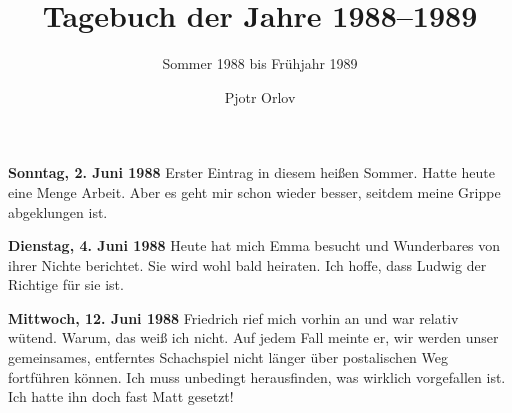 \documentclass[a4paper,11pt,DIV=calc]{scrartcl}
\begin{document}
	
\title{Tagebuch der Jahre 1988--1989}
\subtitle{Sommer 1988 bis Frühjahr 1989}
\author{Pjotr Orlov}
\date{}
\maketitle

\onehalfspace %

\newcommand{\tag}[1]{\bigskip\noindent\textbf{\textsf{#1}}\quad}
	
\tag{Sonntag, 2. Juni 1988} Erster Eintrag in diesem heißen Sommer. Hatte heute eine Menge Arbeit. Aber es geht mir schon wieder besser, seitdem meine Grippe abgeklungen ist.

\tag{Dienstag, 4. Juni 1988} Heute hat mich Emma besucht und Wunderbares von ihrer Nichte berichtet. Sie wird wohl bald heiraten. Ich hoffe, dass Ludwig der Richtige für sie ist.

\tag{Mittwoch, 12. Juni 1988} Friedrich rief mich vorhin an und war relativ wütend. Warum, das weiß ich nicht. Auf jedem Fall meinte er, wir werden unser gemeinsames, entferntes Schachspiel nicht länger über postalischen Weg fortführen können. Ich muss unbedingt herausfinden, was wirklich vorgefallen ist. Ich hatte ihn doch fast Matt gesetzt!
\end{document}
